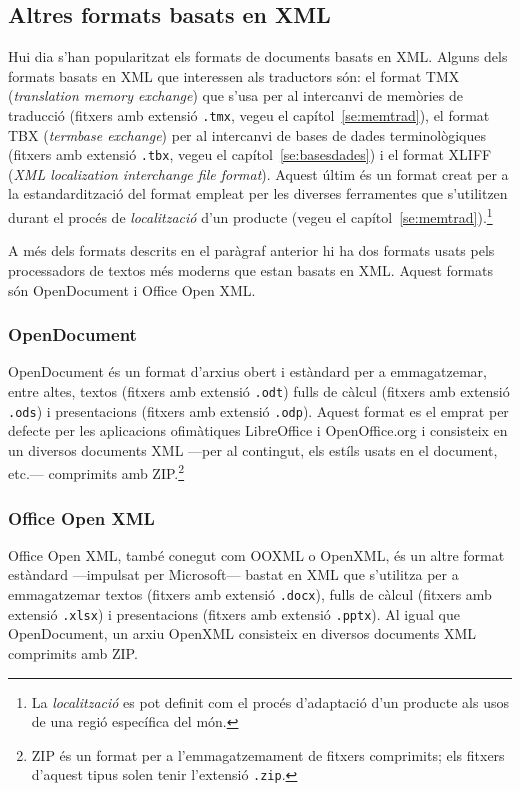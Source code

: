 \subsection{Altres formats basats en XML}
Hui dia s'han popularitzat els formats de documents basats en
XML. Alguns dels formats basats en XML que interessen als traductors
són: el format TMX (\emph{translation memory exchange}) que s'usa per
al intercanvi de memòries de traducció (fitxers amb extensió
\texttt{.tmx}, vegeu el capítol~\ref{se:memtrad}), el format TBX
(\emph{termbase exchange}) per al intercanvi de bases de dades
terminològiques (fitxers amb extensió \texttt{.tbx}, vegeu el
capítol~\ref{se:basesdades}) i el format XLIFF (\emph{XML localization
  interchange file format}). Aquest últim és un format creat per a la
estandardització del format empleat per les diverses ferramentes que
s'utilitzen durant el procés de \emph{localització} d'un producte
(vegeu el capítol~\ref{se:memtrad}).\footnote{La \emph{localització}
  es pot definit com el procés d'adaptació d'un producte als usos de
  una regió específica del món.}

A més dels formats descrits en el paràgraf anterior hi ha dos formats
usats pels processadors de textos més moderns que estan basats en
XML. Aquest formats són OpenDocument i Office Open XML. 

\subsubsection{OpenDocument}
OpenDocument és un format d'arxius obert i estàndard per a
emmagatzemar, entre altes, textos (fitxers amb extensió \texttt{.odt})
fulls de càlcul (fitxers amb extensió \texttt{.ods}) i presentacions
(fitxers amb extensió \texttt{.odp}). Aquest format es el emprat per
defecte per les aplicacions ofimàtiques LibreOffice i OpenOffice.org i
consisteix en un diversos documents XML ---per al contingut, els
estíls usats en el document, etc.--- comprimits amb ZIP.\footnote{ZIP
  és un format per a l'emmagatzemament de fitxers comprimits; els
  fitxers d'aquest tipus solen tenir l'extensió \texttt{.zip}.}

\subsubsection{Office Open XML}
Office Open XML, també conegut com OOXML o OpenXML, és un altre format
estàndard ---impulsat per Microsoft--- bastat en XML que s'utilitza
per a emmagatzemar textos (fitxers amb extensió \texttt{.docx}), fulls
de càlcul (fitxers amb extensió \texttt{.xlsx}) i presentacions
(fitxers amb extensió \texttt{.pptx}). Al igual que OpenDocument, un
arxiu OpenXML consisteix en diversos documents XML comprimits amb ZIP.

